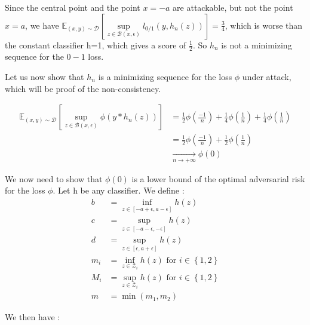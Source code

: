 \begin{prv*}
Since the central point and the point $x=-a$ are attackable, but not the point $x=a$, we have $\mathbb{E}_{(x,y)\sim \mathcal{D}}\left[ \sup\limits_{z \in \mathcal{B}(x,\epsilon)} l_{0/1}(y,h_n(z))\right] = \frac{3}{4}$, which is worse than the constant classifier h=1, which gives a score of $\frac{1}{2}$. So $h_n$ is not a minimizing sequence for the $0-1$ loss.

Let us now show that $h_n$ is a minimizing sequence for the loss $\phi$ under attack, which will be proof of the non-consistency.

\begin{align*}
    \mathbb{E}_{(x,y)\sim \mathcal{D}}\left[ \sup\limits_{z \in \mathcal{B}(x,\epsilon)} \phi(y*h_n(z))\right] &= \frac{1}{2} \phi(\frac{-1}{n}) +\frac{1}{4}\phi(\frac{1}{n}) + \frac{1}{4}\phi(\frac{1}{n})\\
    &=\frac{1}{2}\phi(\frac{-1}{n}) + \frac{1}{2}\phi(\frac{1}{n}) \\
    &\underset{n\to +\infty}{\longrightarrow}\phi(0)
\end{align*}

We now need to show that $\phi(0)$ is a lower bound of the optimal adversarial risk for the loss $\phi$.
Let h be any  classifier. We define :
\begin{align*}
b &= \inf\limits_{z \in \left[ -a + \epsilon, a- \epsilon \right]} h(z) \\
c &= \sup\limits_{z \in \left[ -a - \epsilon, -\epsilon \right]} h(z) \\
d &= \sup\limits_{z \in \left[\epsilon, a + \epsilon \right]} h(z) \\
m_i &= \inf\limits_{z \in \mathcal{Z}_i} h(z) \mbox{  for  }i \in \left\{ 1,2\right\} \\
M_i &= \sup\limits_{z \in \mathcal{Z}_i} h(z) \mbox{  for  }i \in \left\{ 1,2\right\} \\
m &= \min(m_1,m_2)
\end{align*}

We then have :


\end{prv*}
